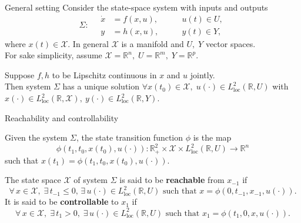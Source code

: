 \documentclass[aspectratio=169]{beamer}
\newcommand{\bbR}{\mathbb{R}}
\begin{document}
\begin{frame}{General setting}
Consider the state-space system  with inputs and outputs
\begin{equation*}
	\Sigma : \quad 
	\begin{aligned}
		\dot{x} &= f(x, u), \\
		y &= h(x,u),
	\end{aligned} \qquad
	\begin{aligned}
		u(t) \in U, \\
		y(t) \in Y,
	\end{aligned}
\end{equation*} 
where $x(t) \in \mathcal{X}$. In general $\mathcal{X}$ is a manifold and $U,\; Y$ vector spaces. \\

For sake simplicity, assume $\mathcal{X} = \bbR^n,\; U=\bbR^m, \; Y=\bbR^p$.

\begin{theorem}
	Suppose $f, h$ to be Lipschitz continuous in $x$ and $u$ jointly. \\
	Then system $\Sigma$ has a unique solution $\forall x(t_0) \in \mathcal{X}, \; u(\cdot) \in L^2_{\text{loc}}(\bbR, U)$ with $x(\cdot) \in L^2_{\text{loc}}(\bbR, \mathcal{X}), \ y(\cdot) \in L^2_{\text{loc}}(\bbR, Y)$.
\end{theorem}

\end{frame}

\begin{frame}{Reachability and controllability}
\begin{overlayarea}{\textwidth}{\textheight}
	
\begin{definition}
		Given the system $\Sigma$, the state transition function $\phi$ is the map 
		\begin{equation*}
			\phi(t_1, t_0, x(t_0), u(\cdot)) : \bbR_+^2 \times \mathcal{X} \times L^{2}_{\text{loc}}(\bbR, U) \rightarrow \bbR^n
		\end{equation*}
		such that $x(t_1) = \phi(t_1, t_0, x(t_0), u(\cdot))$. 
\end{definition}


\begin{definition}
		The state space $\mathcal{X}$ of system $\Sigma$ is said to be \textbf{reachable}
		from $x_{-1}$ if 
		\begin{equation*}
		\forall\, x \in \mathcal{X}, \; \exists\,  t_{-1} \le 0, \, \exists\, u(\cdot) \in L^{2}_{\text{loc}}(\bbR, U) \text{ such that } x = \phi(0, t_{-1}, x_{-1}, u(\cdot)).
		\end{equation*}
				It is said to be \textbf{controllable} to $x_1$ if 
		\begin{equation*}
			\forall\, x \in \mathcal{X}, \; \exists\, t_1 > 0, \; \exists \, u(\cdot) \in L^{2}_{\text{loc}}(\bbR, U) \text{ such that } x_1 = \phi(t_1, 0, x, u(\cdot)).
		\end{equation*}
\end{definition}

\end{overlayarea}

\end{frame}
\end{document}

